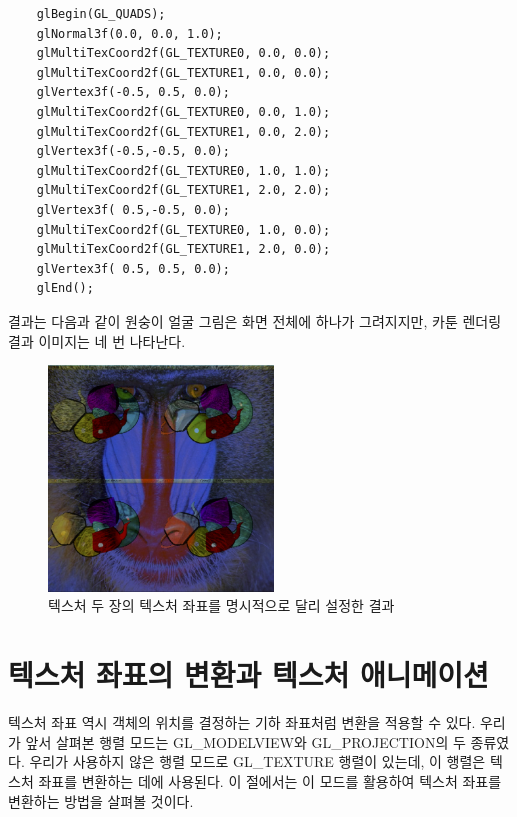 \begin{algorithmbis}\label{code:multiTex2}
\lstset{language=C++} 
\begin{lstlisting}
	glBegin(GL_QUADS);
	glNormal3f(0.0, 0.0, 1.0);
	glMultiTexCoord2f(GL_TEXTURE0, 0.0, 0.0);
	glMultiTexCoord2f(GL_TEXTURE1, 0.0, 0.0);
	glVertex3f(-0.5, 0.5, 0.0);
	glMultiTexCoord2f(GL_TEXTURE0, 0.0, 1.0);
	glMultiTexCoord2f(GL_TEXTURE1, 0.0, 2.0);
	glVertex3f(-0.5,-0.5, 0.0);
	glMultiTexCoord2f(GL_TEXTURE0, 1.0, 1.0);
	glMultiTexCoord2f(GL_TEXTURE1, 2.0, 2.0);
	glVertex3f( 0.5,-0.5, 0.0);
	glMultiTexCoord2f(GL_TEXTURE0, 1.0, 0.0);
	glMultiTexCoord2f(GL_TEXTURE1, 2.0, 0.0);
	glVertex3f( 0.5, 0.5, 0.0);
	glEnd();
\end{lstlisting}
\end{algorithmbis}

결과는 다음과 같이 원숭이 얼굴 그림은 화면 전체에 하나가 그려지지만, 카툰 렌더링 결과 이미지는 네 번 나타난다.
\begin{figure}[h!]
  \centering
	\includegraphics[height=6cm]{OGL_texture/multiTex2.png} 
    \caption{텍스처 두 장의 텍스처 좌표를 명시적으로 달리 설정한 결과}
    \label{fig:OGL_texture:multiTex2}
\end{figure}

\section{텍스처 좌표의 변환과 텍스처 애니메이션}

텍스처 좌표 역시 객체의 위치를 결정하는 기하 좌표처럼 변환을 적용할 수 있다. 우리가 앞서 살펴본 행렬 모드는 {\sf GL\_MODELVIEW}와 {\sf GL\_PROJECTION}의 두 종류였다. 우리가 사용하지 않은 행렬 모드로 {\sf GL\_TEXTURE} 행렬이 있는데, 이 행렬은 텍스처 좌표를 변환하는 데에 사용된다. 이 절에서는 이 모드를 활용하여 텍스처 좌표를 변환하는 방법을 살펴볼 것이다.

